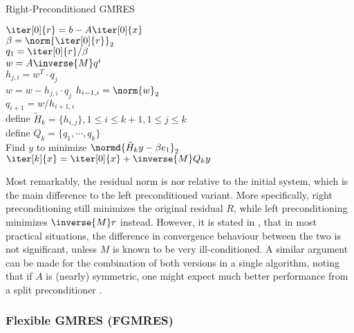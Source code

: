 \begin{algorithm}[h]
  \caption{Right-Preconditioned GMRES}
  \label{alg:predonditioned_gmres}
  \SetAlgoLined
  \DontPrintSemicolon
  $\iter[0]{r} = b-A\iter[0]{x}$ \\
  $\beta = \norm{\iter[0]{r}}_2$ \\
  $q_1 = \iter[0]{r}/\beta$ \\
   {
    $w =A\inverse{M} q^i$ \\
     {
      $h_{j,i} = w^T\cdot q_j$ \\
      $ w = w - h_{j,i}\cdot q_j$}
    $h_{i-1,i} = \norm{w}_2$ \\
    $q_{i+1} = w/h_{i+1,i}$ \\
  }
  define $\tilde{H}_k = \{h_{i,j}\}, 1 \leq i \leq k+1, 1 \leq j \leq k$ \\
  define $Q_k = \{q_1, \cdots, q_k\}$ \\
  Find $y$ to minimize $\normd{\tilde{H}_ky-\beta e_1}_2$ \\
  $\iter[k]{x} = \iter[0]{x} + \inverse{M}Q_ky$
\end{algorithm}

Most remarkably, the residual norm is nor relative to the initial system, which is the main difference to the left preconditioned variant. More specifically, right preconditioning still minimizes the original residual $R$, while left preconditioning minimizes $\inverse{M}r$ instead. However, it is stated in \cite{saad_iterative_2003}, that in most practical situations, the difference in convergence behaviour between the two is not significant, unless $M$ is known to be very ill-conditioned. A similar argument can be made for the combination of both versions in a single algorithm, noting that if $A$ is (nearly) symmetric, one might expect much better performance from a split preconditioner \cite{saad_iterative_2003}.

\subsubsection{Flexible GMRES (FGMRES)}
\label{sec:fgmres}

